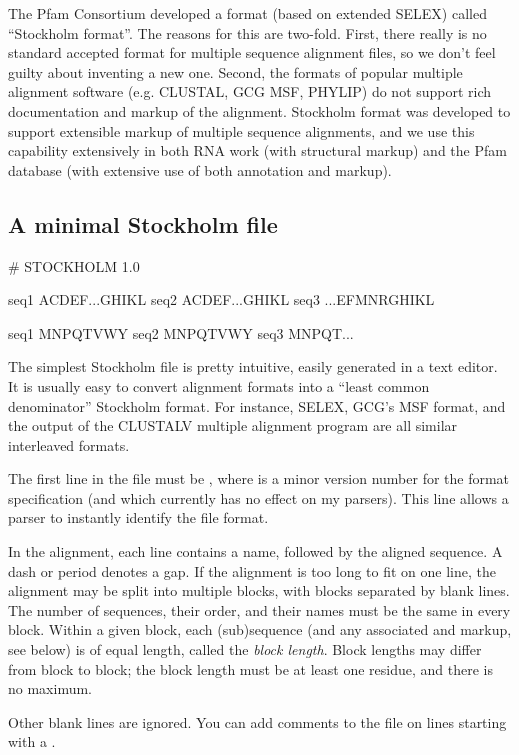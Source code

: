 
The Pfam Consortium developed a format (based on extended SELEX)
called ``Stockholm format''. The reasons for this are two-fold. First,
there really is no standard accepted format for multiple sequence
alignment files, so we don't feel guilty about inventing a new
one. Second, the formats of popular multiple alignment software
(e.g. CLUSTAL, GCG MSF, PHYLIP) do not support rich documentation and
markup of the alignment.  Stockholm format was developed to support
extensible markup of multiple sequence alignments, and we use this
capability extensively in both RNA work (with structural markup) and
the Pfam database (with extensive use of both annotation and markup).

\subsection{A minimal Stockholm file}
\begin{cchunk}
# STOCKHOLM 1.0

seq1  ACDEF...GHIKL
seq2  ACDEF...GHIKL
seq3  ...EFMNRGHIKL

seq1  MNPQTVWY
seq2  MNPQTVWY
seq3  MNPQT...
\end{cchunk}

The simplest Stockholm file is pretty intuitive, easily generated in a
text editor. It is usually easy to convert alignment formats into a
``least common denominator'' Stockholm format. For instance, SELEX,
GCG's MSF format, and the output of the CLUSTALV multiple alignment
program are all similar interleaved formats.

The first line in the file must be , where
 is a minor version number for the format specification
(and which currently has no effect on my parsers). This line allows a
parser to instantly identify the file format.

In the alignment, each line contains a name, followed by the aligned
sequence. A dash or period denotes a gap. If the alignment is too long
to fit on one line, the alignment may be split into multiple blocks,
with blocks separated by blank lines. The number of sequences, their
order, and their names must be the same in every block. Within a given
block, each (sub)sequence (and any associated  and
 markup, see below) is of equal length, called the
\emph{block length}. Block lengths may differ from block to block;
the block length must be at least one residue, and there is no
maximum.  

Other blank lines are ignored. You can add comments to the file on
lines starting with a \ccode{\#}.

